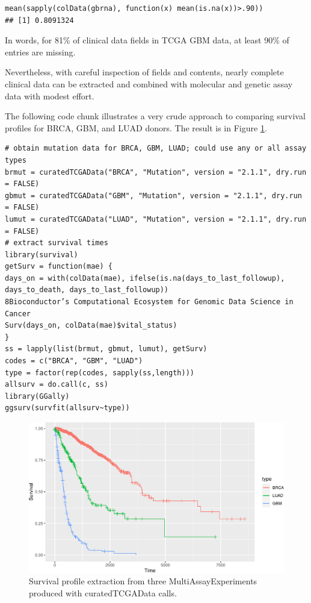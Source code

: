 \begin{verbatim}
mean(sapply(colData(gbrna), function(x) mean(is.na(x))>.90))
## [1] 0.8091324
\end{verbatim}

In words, for 81\% of clinical data fields in TCGA GBM data,
at least 90\% of entries are missing.

Nevertheless, with careful inspection of fields and contents,
nearly complete clinical data can be extracted and combined with molecular
and genetic assay data with modest effort.

The following code chunk illustrates a very crude
approach to comparing survival profiles for BRCA, GBM, and LUAD
donors. The result is in Figure \ref{fig:dothesurv}.


\begin{verbatim}
# obtain mutation data for BRCA, GBM, LUAD; could use any or all assay types
brmut = curatedTCGAData("BRCA", "Mutation", version = "2.1.1", dry.run = FALSE)
gbmut = curatedTCGAData("GBM", "Mutation", version = "2.1.1", dry.run = FALSE)
lumut = curatedTCGAData("LUAD", "Mutation", version = "2.1.1", dry.run = FALSE)
# extract survival times
library(survival)
getSurv = function(mae) {
days_on = with(colData(mae), ifelse(is.na(days_to_last_followup),
days_to_death, days_to_last_followup))
8Bioconductor’s Computational Ecosystem for Genomic Data Science in Cancer
Surv(days_on, colData(mae)$vital_status)
}
ss = lapply(list(brmut, gbmut, lumut), getSurv)
codes = c("BRCA", "GBM", "LUAD")
type = factor(rep(codes, sapply(ss,length)))
allsurv = do.call(c, ss)
library(GGally)
ggsurv(survfit(allsurv~type))
\end{verbatim}

\begin{figure}
\includegraphics[width=0.8\linewidth,]{bioccb_files/figure-latex/dothesurv-1} \caption{Survival profile extraction from three MultiAssayExperiments produced with curatedTCGAData calls.}\label{fig:dothesurv}
\end{figure}

